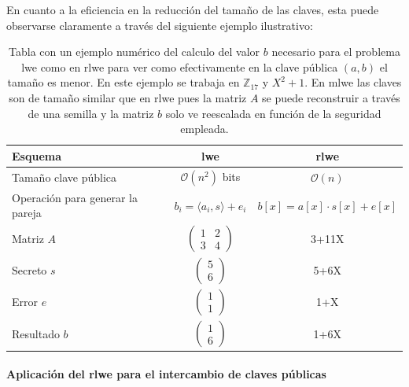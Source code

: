 En cuanto a la eficiencia en la reducción del tamaño de las claves, esta puede observarse claramente a través del siguiente ejemplo ilustrativo:
\begin{table}[H]
	\centering
	\renewcommand{\arraystretch}{1.2}
	\begin{tabular}{lcc}
		\hline
		Esquema & \gls{lwe} & \gls{rlwe} \\
		\hline
		Tamaño clave pública & \(\mathcal{O}(n^2)\) bits & \(\mathcal{O}(n)\)  \\
		\hline
		Operación para generar la pareja & \(b_i=\langle a_i, s \rangle + e_i\) & \(b[x]=a[x]\cdot s[x]+e[x]\)\\
		\hline
		Matriz \(A\) &$\begin{pmatrix}
							1  &2\\
							3 &4
						\end{pmatrix}$ &3+11X\\
		\hline
		Secreto \(s\) & $\begin{pmatrix}
							5\\
							6
						\end{pmatrix}$&5+6X\\
		\hline
		Error \(e\)& $\begin{pmatrix}
							1\\
							1
						\end{pmatrix}$&1+X\\
		\hline
		Resultado \(b\)&$\begin{pmatrix}
							1\\
							6
						\end{pmatrix}$ & 1+6X\\
		\hline
	\end{tabular}
	\caption{Tabla con un ejemplo numérico del calculo del valor \(b\) necesario para el problema \gls{lwe} como en \gls{rlwe} para ver como efectivamente en la clave pública \((a,b)\) el tamaño es menor. En este ejemplo se trabaja en \(\mathbb{Z}_{17}\) y \(X^2 + 1\). En \gls{mlwe} las claves son de tamaño similar que en \gls{rlwe} pues la matriz \(A\) se puede reconstruir a través de una semilla y la matriz \(b\) solo ve reescalada en función de la seguridad empleada.}
	\label{tab:LWE-RLWE}
\end{table}


\newpage

\paragraph{Aplicación del \gls{rlwe} para el intercambio de claves públicas}
\mbox{}\\

